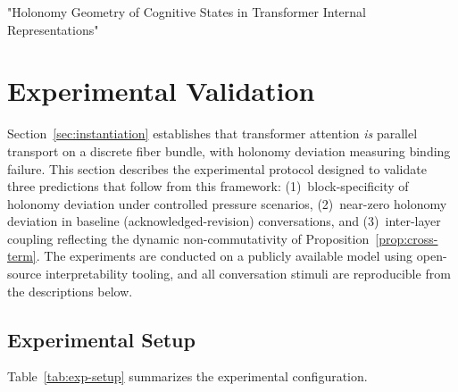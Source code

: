 "Holonomy Geometry of Cognitive States in Transformer Internal Representations"

\section{Experimental Validation}
\label{sec:experiments}

Section~\ref{sec:instantiation} establishes that transformer attention \emph{is} parallel
transport on a discrete fiber bundle, with holonomy deviation measuring binding failure. This section
describes the experimental protocol designed to validate three predictions that follow from
this framework: (1)~block-specificity of holonomy deviation under controlled pressure scenarios,
(2)~near-zero holonomy deviation in baseline (acknowledged-revision) conversations, and (3)~inter-layer
coupling reflecting the dynamic non-commutativity of Proposition~\ref{prop:cross-term}. The
experiments are conducted on a publicly available model using open-source interpretability
tooling, and all conversation stimuli are reproducible from the descriptions below.

\subsection{Experimental Setup}
\label{sec:exp-setup}

Table~\ref{tab:exp-setup} summarizes the experimental configuration.

